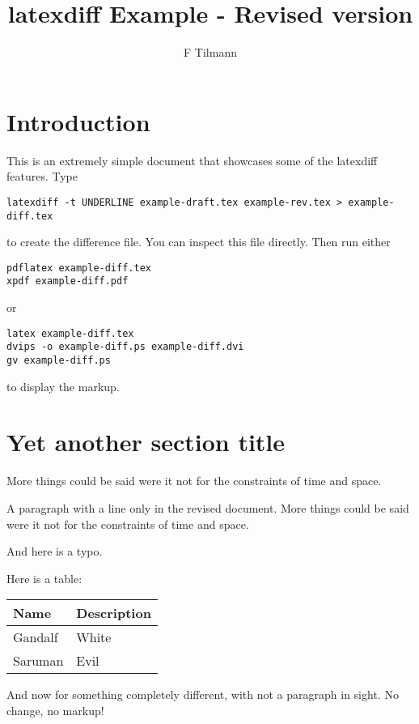 \documentclass[12pt,a4paper]{article}
\title{latexdiff Example - Revised version}
\author{F Tilmann}
\newenvironment{DIFnomarkup}{}{}
\begin{document}
\maketitle

\section*{Introduction}

This is an extremely simple document that showcases some of the latexdiff features.
Type
\begin{verbatim}
latexdiff -t UNDERLINE example-draft.tex example-rev.tex > example-diff.tex
\end{verbatim}
to create the difference file.  You can inspect this file directly. Then run either 
\begin{verbatim}
pdflatex example-diff.tex
xpdf example-diff.pdf
\end{verbatim}
or
\begin{verbatim}
latex example-diff.tex
dvips -o example-diff.ps example-diff.dvi
gv example-diff.ps
\end{verbatim}
to display the markup.

\section*{Yet another section title}

 More things could be said were it not for the constraints of time and space.

A paragraph with a line only in the revised document.  More things could be 
said were it not for the constraints of time and space.

And here is a typo. 

Here is a table:


\begin{DIFnomarkup}
\begin{tabular}{ll}
Name & Description \\
\hline
Gandalf & White \\
Saruman & Evil
\end{tabular}
\end{DIFnomarkup}

And now for something completely different, with not a paragraph in sight.
No change, 
no markup!
\end{document}
